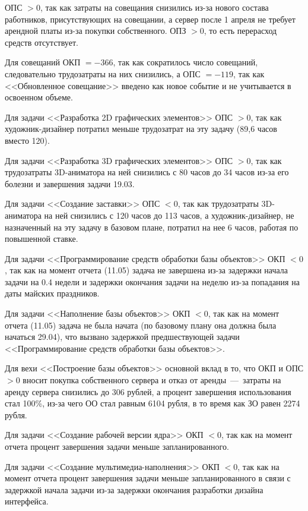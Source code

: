 ОПС $> 0$, так как затраты на совещания снизились из-за нового состава работников, присутствующих на совещании, а сервер после 1 апреля не требует арендной платы из-за покупки собственного.
ОПЗ $> 0$, то есть перерасход средств отсутствует.

Для совещаний ОКП $= -366$, так как сократилось число совещаний, следовательно трудозатраты на них снизились, а ОПС $= -119$, так как <<Обновленное совещание>> введено как новое событие и не учитывается в освоенном объеме.

Для задачи <<Разработка 2D графических элементов>> ОПС $> 0$, так как художник-дизайнер потратил меньше трудозатрат на эту задачу (89,6 часов вместо 120).

Для задачи <<Разработка 3D графических элементов>> ОПС $> 0$, так как трудозатраты 3D-аниматора на ней снизились с 80 часов до 34 часов из-за его болезни и завершения задачи 19.03.

Для задачи <<Создание заставки>> ОПС $< 0$, так как трудозатраты 3D-аниматора на ней снизились с 120 часов до 113 часов, а художник-дизайнер, не назначенный на эту задачу в базовом плане, потратил на нее 6 часов, работая по повышенной ставке.

Для задачи <<Программирование средств обработки базы объектов>> ОКП $< 0$, так как на момент отчета (11.05) задача не завершена из-за задержки начала задачи на 0.4 недели и задержки окончания задачи на неделю из-за попадания на даты майских праздников.

Для задачи <<Наполнение базы объектов>> ОКП $< 0$, так как на момент отчета (11.05) задача не была начата (по базовому плану она должна была начаться 29.04), что вызвано задержкой предшествующей задачи <<Программирование средств обработки базы объектов>>.

Для вехи <<Построение базы объектов>> основной вклад в то, что ОКП и ОПС $> 0$ вносит покупка собственного сервера и отказ от аренды~---~затраты на аренду сервера снизились до 306 рублей, а процент завершения использования стал 100\%, из-за чего ОО стал равным 6104 рубля, в то время как ЗО равен 2274 рубля.

Для задачи <<Создание рабочей версии ядра>> ОКП $< 0$, так как на момент отчета процент завершения задачи меньше запланированного.

Для задачи <<Создание мультимедиа-наполнения>> ОКП $< 0$, так как на момент отчета процент завершения задачи меньше запланированного в связи с задержкой начала задачи из-за задержки окончания разработки дизайна интерфейса.

